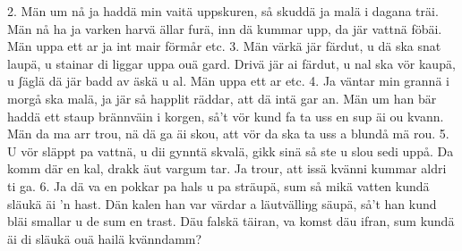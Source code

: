 2.  Män um nå ja haddä min vaitä uppskuren,
    så skuddä ja malä i dagana träi.
    Män nå ha ja varken harvä ällar furä,
    inn dä kummar upp, da jär vattnä föbäi.
    \qquad{}Män uppa ett ar ja int mair förmår etc.
3.  Män värkä jär färdut, u dä ska snat laupä,
    u stainar di liggar uppa ouä gard.
    Drivä jär ai färdut, u nal ska vör kaupä,
    u ʃäglä dä jär badd av äskä u al.
    \qquad{}Män uppa ett ar etc.
4.  Ja väntar min grannä i morgå ska malä,
    ja jär så happlit räddar, att dä intä gar an.
    Män um han bär haddä ett staup brännväin i korgen,
    så’t vör kund fa ta uss en sup äi ou kvann.
    \qquad{}Män da ma arr trou, nä dä ga äi skou,
    \qquad{}att vör da ska ta uss a blundå mä rou.
5.  U vör släppt pa vattnä, u dii gynntä skvalä,
    gikk sinä så ste u slou sedi uppå.
    Da komm där en kal, drakk äut vargum tar.
    Ja trour, att issä kvänni kummar aldri ti ga.
6.  Ja dä va en pokkar pa hals u pa sträupä,
    sum så mikä vatten kundä släukä äi ’n hast.
    Dän kalen han var värdar a läutvälliŋg säupä,
    så’t han kund bläi smallar u de sum en trast.
    \qquad{}Däu falskä täiran, va komst däu ifran,
    \qquad{}sum kundä äi di släukä ouä hailä kvänndamm?
